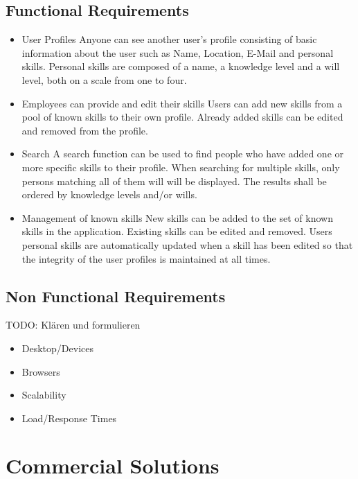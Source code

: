 \subsection{Functional Requirements}
\begin{itemize}
	\item User Profiles
	Anyone can see another user’s profile consisting of basic information about the user such as Name, Location, E-Mail and personal skills. Personal skills are composed of a name, a knowledge level and a will level, both on a scale from one to four.
	\item Employees can provide and edit their skills
	Users can add new skills from a pool of known skills to their own profile. Already added skills can be edited and removed from the profile.
	\item Search
	A search function can be used to find people who have added one or more specific skills to their profile. When searching for multiple skills, only persons matching all of them will will be displayed. The results shall be ordered by knowledge levels and/or wills.
	\item Management of known skills
	New skills can be added to the set of known skills in the application. Existing skills can be edited and removed. Users personal skills are automatically updated when a skill has been edited so that the integrity of the user profiles is maintained at all times.
\end{itemize}



\subsection{Non Functional Requirements}
TODO: Klären und formulieren
\begin{itemize}
	\item Desktop/Devices
	\item Browsers
	\item Scalability
	\item Load/Response Times
\end{itemize}


\section{Commercial Solutions}
